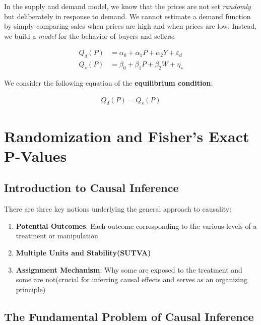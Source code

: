 In the supply and demand model, we know that the prices are not set \textit{randomly} but deliberately in response to demand.
We cannot estimate a demand function by simply comparing sales when prices are high and when prices are low. Instead, we build a \textit{model} for the behavior of buyers and sellers:

\begin{align}
    Q_d(P) &= \alpha_0 + \alpha_1 P + \alpha_2 Y + \varepsilon_d \label{eq:demand_function}\\
    Q_s(P) &= \beta_0 + \beta_1 P + \beta_2 W + \eta_s \label{eq:supply_function}
\end{align}

We consider the following equation of the \textbf{equilibrium condition}:

\begin{align*}
    Q_d(P) = Q_s(P)
\end{align*}


\newpage

\section{Randomization and Fisher's Exact P-Values}
\label{sec:randomization_and_fisher_s_exact_p_values}

\subsection{Introduction to Causal Inference}

There are three key notions underlying the general approach to causality:

\begin{enumerate}
    \item \textbf{Potential Outcomes}: Each outcome corresponding to the various levels of a treatment or manipulation
    \item \textbf{Multiple Units and Stability(SUTVA)}
    \item \textbf{\color{red}Assignment Mechanism}: Why some are exposed to the treatment and some are not(crucial for inferring causal effects and serves as an organizing principle)
\end{enumerate}


\subsection{The Fundamental Problem of Causal Inference}

